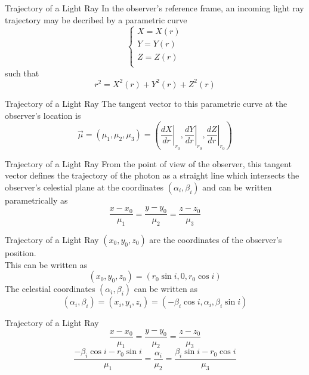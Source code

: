 \documentclass{beamer}
\begin{document}
\begin{darkframes}

\begin{frame}{Trajectory of a Light Ray}
	In the observer's reference frame, an incoming light ray trajectory may be decribed by a parametric curve
	\[ \begin{cases}
	X = X(r)\\
	Y = Y(r)\\
	Z = Z(r)\\
	\end{cases} \] 
	such that
	\[ r^2 = X^2 (r) + Y^2 (r) + Z^2 (r) \]	 
\end{frame}	

\begin{frame}{Trajectory of a Light Ray}
	The tangent vector to this parametric curve at the observer's location is
	\[ \vec{\mu} = (\mu_1, \mu_2, \mu_3) = \left( \left. \frac{dX}{dr}\right|_{r_0}, \left. \frac{dY}{dr} \right|_{r_0}, \left. \frac{dZ}{dr} \right|_{r_0} \right) \]	 
\end{frame}
	
\begin{frame}{Trajectory of a Light Ray}
	From the point of view of the observer, this tangent vector defines the trajectory of the photon as a straight line which intersects the observer's celestial plane at the coordinates $(\alpha_i, \beta_i)$ and can be written parametrically as
	\[ \frac{x-x_0}{\mu_1} = \frac{y-y_0}{\mu_2} = \frac{z-z_0}{\mu_3}\]
\end{frame}

\begin{frame}{Trajectory of a Light Ray}
$(x_0, y_0, z_0)$ are the coordinates of the observer's position.\\
\pause
This can be written as
\[ (x_0, y_0, z_0) = (r_0 \sin i, 0, r_0 \cos i)\]	
\pause
The celestial coordinates $(\alpha_i, \beta_i)$ can be written as
\[ (\alpha_i, \beta_i) = (x_i, y_i, z_i) = (-\beta_i \cos i, \alpha_i, \beta_i \sin i)\]
\end{frame}

\begin{frame}{Trajectory of a Light Ray}
	\[ \frac{x-x_0}{\mu_1} = \frac{y-y_0}{\mu_2} = \frac{z-z_0}{\mu_3}\]
	\pause
	\[ \frac{-\beta_i \cos i-r_0 \sin i}{\mu_1} = \frac{\alpha_i}{\mu_2} = \frac{\beta_i \sin i-r_0 \cos i}{\mu_3}\]
\end{frame}


\end{darkframes}
\end{document}
